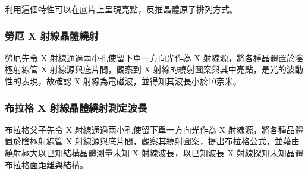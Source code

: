 \documentclass[a4paper,12pt]{article}
\begin{document}
利用這個特性可以在底片上呈現亮點，反推晶體原子排列方式。
\subsubsection{勞厄 X 射線晶體繞射}
勞厄先令 X 射線通過兩小孔使留下單一方向光作為 X 射線源，將各種晶體置於陰極射線管 X 射線源與底片間，觀察到 X 射線的繞射圖案與其中亮點，是光的波動性的表現，故確認 X 射線為電磁波，並得知其波長小於10奈米。
\subsubsection{布拉格 X 射線晶體繞射測定波長}
布拉格父子先令 X 射線通過兩小孔使留下單一方向光作為 X 射線源，將各種晶體置於陰極射線管 X 射線源與底片間，觀察其繞射圖案，提出布拉格公式，並藉由繞射極大以已知結構晶體測量未知 X 射線波長，以已知波長 X 射線探知未知晶體布拉格面距離與結構。
\end{document}
